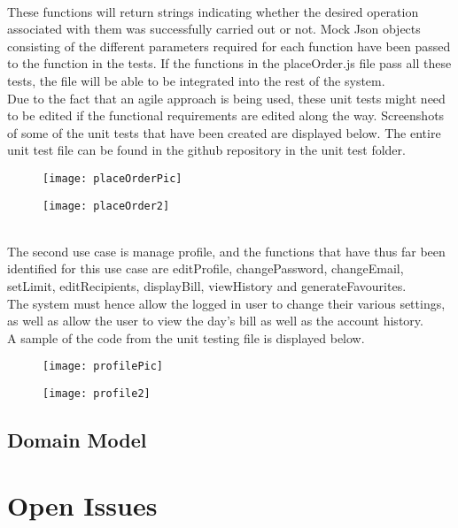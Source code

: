 \documentclass[12pt]{article}
\begin{document}
\\These functions will return strings indicating whether the desired operation associated with them was successfully carried out or not. Mock Json objects consisting of the different parameters required for each function have been passed to the function in the tests. If the functions in the placeOrder.js file pass all these tests, the file will be able to be integrated into the rest of the system. 
\\
Due to the fact that an agile approach is being used, these unit tests might need to be edited if the functional requirements are edited along the way. Screenshots of some of the unit tests that have been created are displayed below. The entire unit test file can be found in the github repository in the unit test folder.  
\begin{figure}[h!]
  \centering
    \texttt{[image: placeOrderPic]} 
\end{figure}
\begin{figure}[h!]
  \centering
    \texttt{[image: placeOrder2]} 
\end{figure}
\\
The second use case is manage profile, and the functions that have thus far been identified for this use case are editProfile, changePassword, changeEmail, setLimit, editRecipients, displayBill, viewHistory and generateFavourites. 
\\
The system must hence allow the logged in user to change their various settings, as well as allow the user to view the day's bill as well as the account history.
\\
A sample of the code from the unit testing file is displayed below.
\begin{figure}[h!]
  \centering
    \texttt{[image: profilePic]} 
\end{figure}
\begin{figure}[h!]
  \centering
    \texttt{[image: profile2]} 
\end{figure}

\subsection{Domain Model}


\section{Open Issues}
\end{document}
